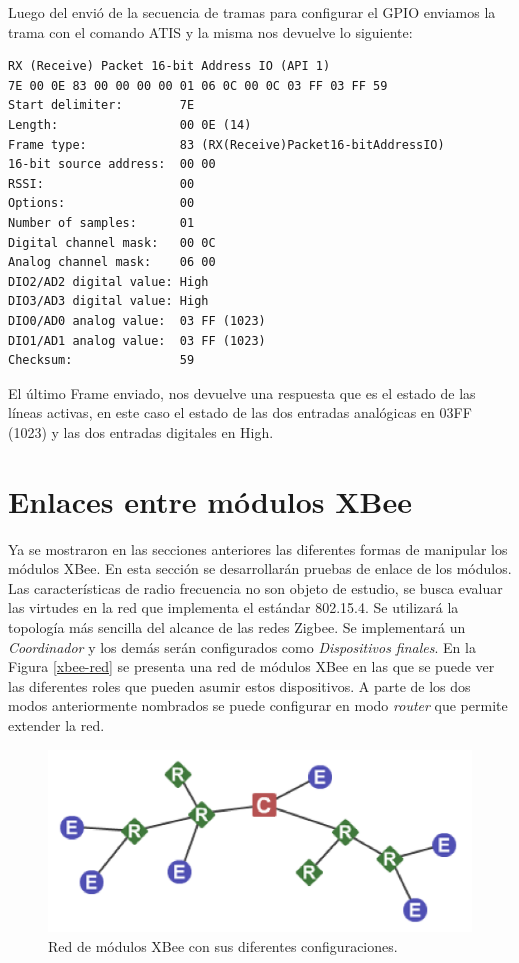 \documentclass[11pt,oneside,spanish,a4paper]{article}
\begin{document}
Luego del envió de la secuencia de tramas para configurar el GPIO enviamos la trama con el comando ATIS y la misma nos devuelve lo siguiente:
\begin{lstlisting}[emph={RX,(,Receive,),Packet,16,-,bit,Address,IO,(API, 1),Start,delimiter:,Length:,Frame, type:,16-bit, source, address:, RSSI:,Options:,Number, of, samples:,Digital, channel, mask:,Analog ,channel mask: ,DIO2/AD2, digital, value: ,DIO3/AD3, DIO0/AD0, analog}, emphstyle={\color{black}}, label=code:apiEjempl-id]
RX (Receive) Packet 16-bit Address IO (API 1)
7E 00 0E 83 00 00 00 00 01 06 0C 00 0C 03 FF 03 FF 59
Start delimiter:        7E
Length:                 00 0E (14)
Frame type:             83 (RX(Receive)Packet16-bitAddressIO)
16-bit source address:  00 00
RSSI:                   00
Options:                00
Number of samples:      01
Digital channel mask:   00 0C
Analog channel mask:    06 00
DIO2/AD2 digital value: High
DIO3/AD3 digital value: High
DIO0/AD0 analog value:  03 FF (1023)
DIO1/AD1 analog value:  03 FF (1023)
Checksum:               59
\end{lstlisting} 
El último Frame enviado, nos devuelve una respuesta que es el estado de las líneas activas, en este caso el estado de las dos entradas analógicas en 03FF (1023) y las dos entradas digitales en High.
\newpage{}

\section{Enlaces entre módulos XBee}
\label{sec:enlace}

Ya se mostraron en las secciones anteriores las diferentes formas de
manipular los módulos XBee. En esta sección se desarrollarán pruebas
de enlace de los módulos. Las características de radio frecuencia no
son objeto de estudio, se busca evaluar las virtudes en la red que
implementa el estándar 802.15.4. Se utilizará la topología más
sencilla del alcance de las redes Zigbee. Se implementará un
\emph{Coordinador} y los demás serán configurados como
\emph{Dispositivos finales}. En la Figura \ref{xbee-red} se presenta
una red de módulos XBee en las que se puede ver las diferentes
roles que pueden asumir estos dispositivos. A parte de los dos modos
anteriormente nombrados se puede configurar en modo \emph{router} que
permite extender la red. 

\begin{figure}[ht]
  \centering
  \includegraphics[width=.8\textwidth]{img/xbee-topo}
  \caption{Red de módulos XBee con sus diferentes configuraciones.}
  \label{fig:xbee-red}
\end{figure}
\end{document}
